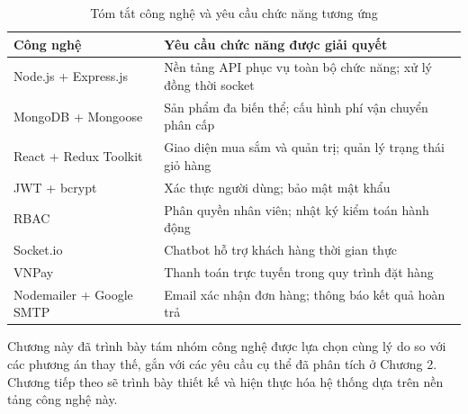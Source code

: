\documentclass[../DoAn.tex]{subfiles}
\begin{document}
\begin{table}[H]
\centering
\caption{Tóm tắt công nghệ và yêu cầu chức năng tương ứng}
\label{tab:tech-summary}
\begin{tabular}{|p{4cm}|p{8.5cm}|}
\hline
\textbf{Công nghệ} & \textbf{Yêu cầu chức năng được giải quyết} \\
\hline
Node.js + Express.js & Nền tảng API phục vụ toàn bộ chức năng; xử lý đồng thời socket \\
\hline
MongoDB  \break + Mongoose & Sản phẩm đa biến thể; cấu hình phí vận chuyển phân cấp \\
\hline
React + Redux Toolkit & Giao diện mua sắm và quản trị; quản lý trạng thái giỏ hàng \\
\hline
JWT + bcrypt & Xác thực người dùng; bảo mật mật khẩu \\
\hline
RBAC & Phân quyền nhân viên; nhật ký kiểm toán hành động \\
\hline
Socket.io & Chatbot hỗ trợ khách hàng thời gian thực \\
\hline
VNPay & Thanh toán trực tuyến trong quy trình đặt hàng \\
\hline
Nodemailer + Google SMTP & Email xác nhận đơn hàng; thông báo kết quả hoàn trả \\
\hline
\end{tabular}
\end{table}

Chương này đã trình bày tám nhóm công nghệ được lựa chọn cùng lý do so với các
phương án thay thế, gắn với các yêu cầu cụ thể đã phân tích ở Chương 2. Chương
tiếp theo sẽ trình bày thiết kế và hiện thực hóa hệ thống dựa trên nền tảng công
nghệ này.

\end{document}
